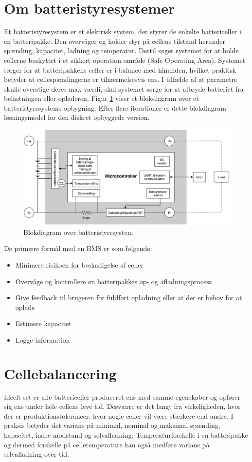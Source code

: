\section{Om batteristyresystemer}
Et batteristyresystem er et elektrisk system, der styrer de enkelte battericeller i en batteripakke. Den overvåger og holder styr på cellens tilstand herunder spænding, kapacitet, ladning og temperatur. Dertil søger systemet for at holde cellerne beskyttet i et sikkert operation område (Safe Operating Area). Systemet sørger for at batteripakkens celler er i balance med hinanden, hvilket praktisk betyder at cellespændingerne er tilnærmelsesvis ens. I tilfælde af at parametre skulle overstige deres max værdi, skal systemet sørge for at afbryde batteriet fra belastningen eller opladeren. Figur \ref{fig:blokdiagram} viser et blokdiagram over et batteristyresystems opbygning. Efter flere iterationer er dette blokdiagram løsningsmodel for den diskret opbyggede version.

\begin{figure}[h]
	\centering
	\includegraphics[width=15cm]{billeder/blokdiagram.png}
	\caption{Blokdiagram over batteristyresystem}
	\label{fig:blokdiagram}
\end{figure}

De primære formål med en BMS er som følgende:
\begin{itemize}[noitemsep]
	\item Minimere risikoen for beskadigelse af celler
	\item Overvåge og kontrollere en batteripakkes op- og afladningsprocess
	\item Give feedback til brugeren for fuldført opladning eller at der er behov for at oplade
	\item Estimere kapacitet
	\item Logge information
\end{itemize}


\section{Cellebalancering}
Ideelt set er alle battericeller produceret ens med samme egenskaber og opfører sig ens under hele cellens leve tid. Desværre er det langt fra virkeligheden, hvor der er produktionstolerancer, hvor nogle celler vil være stærkere end andre. I praksis betyder det varians på minimal, nominal og maksimal spænding, kapacitet, indre modstand og selvafladning.
Temperaturforskelle i en batteripakke og dermed forskelle på celletemperature kan også medføre varians på selvafladning over tid.
\\

